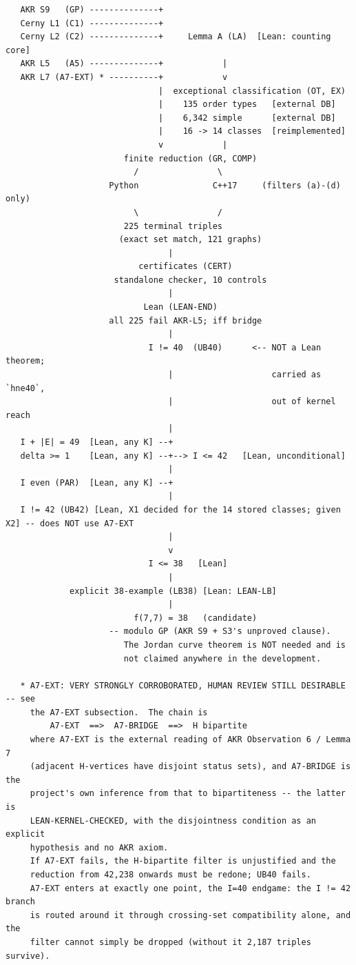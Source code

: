 \documentclass[11pt,a4paper]{article}
\theoremstyle{plain}
\theoremstyle{definition}
\theoremstyle{remark}
\begin{document}
{\footnotesize
\begin{verbatim}
   AKR S9   (GP) --------------+
   Cerny L1 (C1) --------------+
   Cerny L2 (C2) --------------+     Lemma A (LA)  [Lean: counting core]
   AKR L5   (A5) --------------+            |
   AKR L7 (A7-EXT) * ----------+            v
                               |  exceptional classification (OT, EX)
                               |    135 order types   [external DB]
                               |    6,342 simple      [external DB]
                               |    16 -> 14 classes  [reimplemented]
                               v            |
                        finite reduction (GR, COMP)
                          /                \
                     Python               C++17     (filters (a)-(d) only)
                          \                /
                        225 terminal triples
                       (exact set match, 121 graphs)
                                 |
                           certificates (CERT)
                      standalone checker, 10 controls
                                 |
                            Lean (LEAN-END)
                     all 225 fail AKR-L5; iff bridge
                                 |
                             I != 40  (UB40)      <-- NOT a Lean theorem;
                                 |                    carried as `hne40`,
                                 |                    out of kernel reach
                                 |
   I + |E| = 49  [Lean, any K] --+
   delta >= 1    [Lean, any K] --+--> I <= 42   [Lean, unconditional]
                                 |
   I even (PAR)  [Lean, any K] --+
                                 |
   I != 42 (UB42) [Lean, X1 decided for the 14 stored classes; given X2] -- does NOT use A7-EXT
                                 |
                                 v
                             I <= 38   [Lean]
                                 |
             explicit 38-example (LB38) [Lean: LEAN-LB]
                                 |
                          f(7,7) = 38   (candidate)
                     -- modulo GP (AKR S9 + S3's unproved clause).
                        The Jordan curve theorem is NOT needed and is
                        not claimed anywhere in the development.

   * A7-EXT: VERY STRONGLY CORROBORATED, HUMAN REVIEW STILL DESIRABLE -- see
     the A7-EXT subsection.  The chain is
         A7-EXT  ==>  A7-BRIDGE  ==>  H bipartite
     where A7-EXT is the external reading of AKR Observation 6 / Lemma 7
     (adjacent H-vertices have disjoint status sets), and A7-BRIDGE is the
     project's own inference from that to bipartiteness -- the latter is
     LEAN-KERNEL-CHECKED, with the disjointness condition as an explicit
     hypothesis and no AKR axiom.
     If A7-EXT fails, the H-bipartite filter is unjustified and the
     reduction from 42,238 onwards must be redone; UB40 fails.
     A7-EXT enters at exactly one point, the I=40 endgame: the I != 42 branch
     is routed around it through crossing-set compatibility alone, and the
     filter cannot simply be dropped (without it 2,187 triples survive).
\end{verbatim}
}
\end{document}
